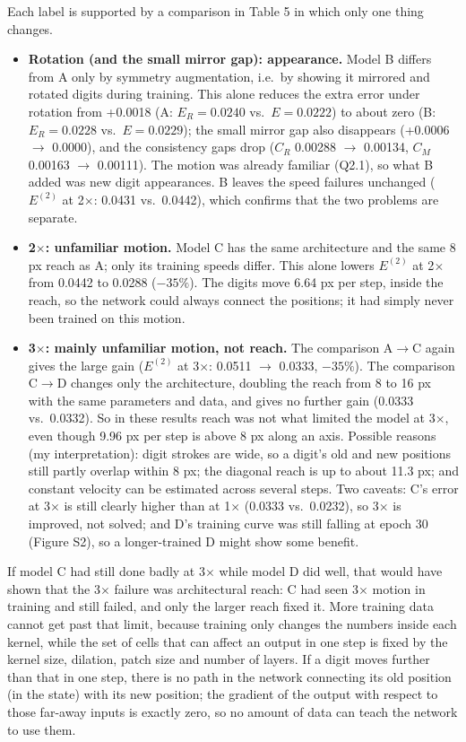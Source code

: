 Each label is supported by a comparison in Table 5 in which only one thing changes.
\begin{itemize}
\item \textbf{Rotation (and the small mirror gap): appearance.} Model B differs from A only by symmetry augmentation, i.e.\ by showing it mirrored and rotated digits during training. This alone reduces the extra error under rotation from +0.0018 (A: $E_R=0.0240$ vs.\ $E=0.0222$) to about zero (B: $E_R=0.0228$ vs.\ $E=0.0229$); the small mirror gap also disappears (+0.0006 $\to$ 0.0000), and the consistency gaps drop ($C_R$ 0.00288 $\to$ 0.00134, $C_M$ 0.00163 $\to$ 0.00111). The motion was already familiar (Q2.1), so what B added was new digit appearances. B leaves the speed failures unchanged ($E^{(2)}$ at 2$\times$: 0.0431 vs.\ 0.0442), which confirms that the two problems are separate.
\item \textbf{2$\times$: unfamiliar motion.} Model C has the same architecture and the same 8 px reach as A; only its training speeds differ. This alone lowers $E^{(2)}$ at 2$\times$ from 0.0442 to 0.0288 ($-35\%$). The digits move 6.64 px per step, inside the reach, so the network could always connect the positions; it had simply never been trained on this motion.
\item \textbf{3$\times$: mainly unfamiliar motion, not reach.} The comparison A$\to$C again gives the large gain ($E^{(2)}$ at 3$\times$: 0.0511 $\to$ 0.0333, $-35\%$). The comparison C$\to$D changes only the architecture, doubling the reach from 8 to 16 px with the same parameters and data, and gives no further gain (0.0333 vs.\ 0.0332). So in these results reach was not what limited the model at 3$\times$, even though 9.96 px per step is above 8 px along an axis. Possible reasons (my interpretation): digit strokes are wide, so a digit's old and new positions still partly overlap within 8 px; the diagonal reach is up to about 11.3 px; and constant velocity can be estimated across several steps. Two caveats: C's error at 3$\times$ is still clearly higher than at 1$\times$ (0.0333 vs.\ 0.0232), so 3$\times$ is improved, not solved; and D's training curve was still falling at epoch 30 (Figure S2), so a longer-trained D might show some benefit.
\end{itemize}
If model C had still done badly at 3$\times$ while model D did well, that would have shown that the 3$\times$ failure was architectural reach: C had seen 3$\times$ motion in training and still failed, and only the larger reach fixed it. More training data cannot get past that limit, because training only changes the numbers inside each kernel, while the set of cells that can affect an output in one step is fixed by the kernel size, dilation, patch size and number of layers. If a digit moves further than that in one step, there is no path in the network connecting its old position (in the state) with its new position; the gradient of the output with respect to those far-away inputs is exactly zero, so no amount of data can teach the network to use them.

